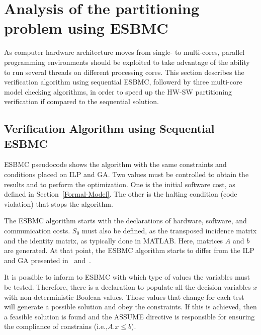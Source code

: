 \section{Analysis of the partitioning problem using ESBMC}
\label{Analysis-of-the-partitioning-problem-using-ESBMC}

As computer hardware architecture moves from single- to multi-cores, parallel programming environments should be exploited to take advantage of the ability to run several threads on different processing cores. This section describes the verification algorithm using sequential ESBMC, followerd by three multi-core model checking algorithms, in order to speed up the HW-SW partitioning verification if compared to the sequential solution.

\subsection{Verification Algorithm using Sequential ESBMC}
\label{Verification-Algorithm-using-ESBMC}

ESBMC pseudocode shows the algorithm with the same constraints and conditions placed on ILP and GA. Two values must be controlled to obtain the results and to perform the optimization. One is the initial software cost, as defined in Section~\ref{Formal-Model}. The other is the halting condition (code violation) that stops the algorithm.

The ESBMC algorithm starts with the declarations of hardware, software, and communication costs. $S_0$ must also be defined, as the transposed incidence matrix and the identity matrix, as typically done in MATLAB. Here, matrices $A$ and $b$ are generated. At that point, the ESBMC algorithm starts to differ from the ILP and GA presented in~\cite{Trindade2015} and~\cite{Trindade2014}.

It is possible to inform to ESBMC with which type of values the variables must be tested. Therefore, there is a declaration to populate all the decision variables $x$ with non-deterministic Boolean values. Those values that change for each test will generate a possible solution and obey the constraints. If this is achieved, then a feasible solution is found and the ASSUME directive is responsible for ensuring the compliance of constrains (i.e.,$A.x \leq b$).

